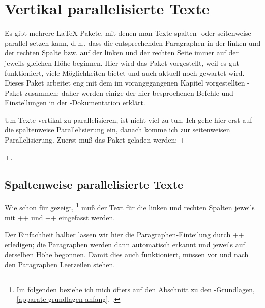 
\newcommand\reledpar{\mbox{\Package{reledpar}}\xspace}

\section{Vertikal parallelisierte Texte}

\DefineShortVerb{\+}


\noindent Es gibt mehrere \LaTeX-Pakete, mit denen man Texte spalten- oder seitenweise parallel setzen kann, d.\,h., dass die entsprechenden Paragraphen in der linken und der rechten Spalte bzw. auf der linken und der rechten Seite immer auf der jeweils gleichen Höhe beginnen.
Hier wird das Paket \reledpar vorgestellt, weil es gut funktioniert, viele Möglichkeiten bietet und auch aktuell noch gewartet wird.
Dieses Paket arbeitet eng mit dem im vorangegangenen Kapitel vorgestellten \reledmac-Paket zusammen; daher werden einige der hier besprochenen Befehle und Einstellungen in der \reledmac-Dokumentation erklärt.

Um Texte vertikal zu parallelisieren, ist nicht viel zu tun. Ich gehe hier erst auf die spaltenweise Parallelisierung ein, danach komme ich zur seitenweisen Parallelisierung. Zuerst muß das Paket geladen werden: +\usepackage{reledpar}+.


\subsection{Spaltenweise parallelisierte Texte}

Wie schon für \reledmac gezeigt,%
\footnote{Im folgenden beziehe ich mich öfters auf den Abschnitt zu den \reledmac-Grundlagen, \cref{apparate-grundlagen-anfang}, .}
muß der Text für die linken und rechten Spalten jeweils mit +\beginnumbering+ und +\endnumbering+ eingefasst werden.%

Der Einfachheit halber lassen wir hier die Paragraphen-Einteilung durch +\autopar+ erledigen;
die Paragraphen werden dann automatisch erkannt und jeweils auf derselben Höhe begonnen.
Damit dies auch funktioniert, müssen vor und nach den Paragraphen Leerzeilen stehen.

